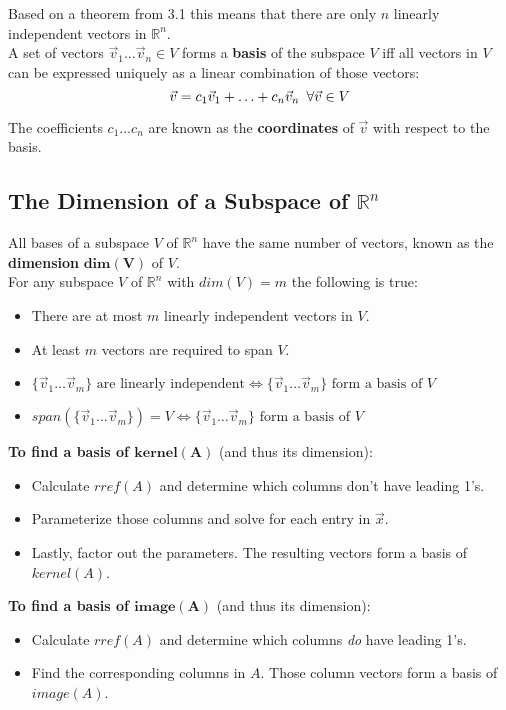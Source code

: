 \documentclass[]{scrartcl}
\begin{document}
	Based on a theorem from 3.1 this means that there are only $n$ linearly independent vectors in $\mathbb{R}^n$.\\
	
	A set of vectors $\vec{v}_1 \ldots \vec{v}_n \in V$ forms a \textbf{basis} of the subspace $V$ iff all vectors in $V$ can be expressed uniquely as a linear combination of those vectors:
	$$\vec{v} = c_1\vec{v}_1 + \ldots + c_n\vec{v}_n \enskip \forall \vec{v} \in V$$
	
	The coefficients $c_1 \ldots c_n$ are known as the \textbf{coordinates} of $\vec{v}$ with respect to the basis.
	
	\subsection{The Dimension of a Subspace of $\mathbb{R}^n$}
	
	All bases of a subspace $V$ of $\mathbb{R}^n$ have the same number of vectors, known as the \textbf{dimension} $\boldsymbol{dim(V)}$ of $V$.\\
	
	For any subspace $V$ of $\mathbb{R}^n$ with $dim(V)=m$ the following is true:
	\begin{itemize}
		\item There are at most $m$ linearly independent vectors in $V$.
		\item At least $m$ vectors are required to span $V$.
		\item $ \{\vec{v}_1 \ldots \vec{v}_m\} \text{ are linearly independent} \iff \{\vec{v}_1 \ldots \vec{v}_m\} \text{ form a basis of } V$
		\item $ span(\{\vec{v}_1 \ldots \vec{v}_m\}) = V \iff \{\vec{v}_1 \ldots \vec{v}_m\} \text{ form a basis of } V$
	\end{itemize}

	\textbf{To find a basis of $\boldsymbol{kernel(A)}$} (and thus its dimension):
	\begin{itemize}
		\item Calculate $rref(A)$ and determine which columns don't have leading 1's.
		\item Parameterize those columns and solve for each entry in $\vec{x}$.
		\item Lastly, factor out the parameters. The resulting vectors form a basis of $kernel(A)$.
	\end{itemize}

	\textbf{To find a basis of $\boldsymbol{image(A)}$} (and thus its dimension):
	\begin{itemize}
		\item Calculate $rref(A)$ and determine which columns \textit{do} have leading 1's.
		\item Find the corresponding columns in $A$. Those column vectors form a basis of $image(A)$.
	\end{itemize}
	
\end{document}
